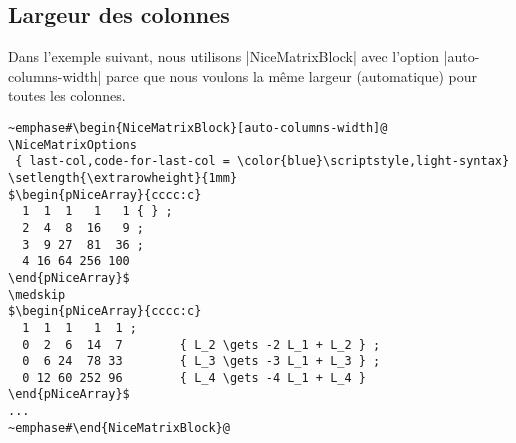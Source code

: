 \documentclass[dvipsnames]{article}%
\begin{document}
\subsection{Largeur des colonnes}

\medskip
Dans l'exemple suivant, nous utilisons |{NiceMatrixBlock}| avec l'option
|auto-columns-width| parce que nous voulons la même largeur (automatique) pour
toutes les colonnes.

\bigskip
\begin{BVerbatim}
~emphase#\begin{NiceMatrixBlock}[auto-columns-width]@
\NiceMatrixOptions
 { last-col,code-for-last-col = \color{blue}\scriptstyle,light-syntax}
\setlength{\extrarowheight}{1mm}
$\begin{pNiceArray}{cccc:c}
  1  1  1   1   1 { } ;
  2  4  8  16   9 ;
  3  9 27  81  36 ;
  4 16 64 256 100 
\end{pNiceArray}$
\medskip
$\begin{pNiceArray}{cccc:c}
  1  1  1   1  1 ;
  0  2  6  14  7        { L_2 \gets -2 L_1 + L_2 } ;
  0  6 24  78 33        { L_3 \gets -3 L_1 + L_3 } ;
  0 12 60 252 96        { L_4 \gets -4 L_1 + L_4 } 
\end{pNiceArray}$
...
~emphase#\end{NiceMatrixBlock}@
\end{BVerbatim}

\bigskip
\end{document}
